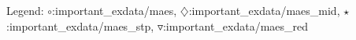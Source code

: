 Legend: {\color{NavyBlue}$\circ$}:important\_exdata/maes, {\color{Magenta}$\diamondsuit$}:important\_exdata/maes\_mid, {\color{Orange}$\star$}:important\_exdata/maes\_stp, {\color{CornflowerBlue}$\triangledown$}:important\_exdata/maes\_red